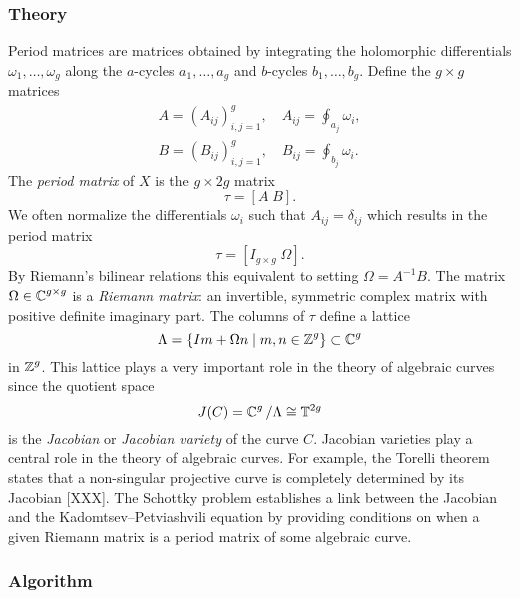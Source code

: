 %
\subsubsection*{Theory}
%

Period matrices are matrices obtained by integrating the holomorphic
differentials $\omega_1, \ldots, \omega_g$ along the $a$-cycles
$a_1,\ldots,a_g$ and $b$-cycles $b_1,\ldots,b_g$. Define the $g \times g$
matrices
\begin{align*}
    A = \left( A_{ij} \right)_{i,j=1}^g,
    \quad A_{ij} = \oint_{a_j} \omega_i, \\
    B = \left( B_{ij} \right)_{i,j=1}^g,
    \quad B_{ij} = \oint_{b_j} \omega_i.
\end{align*}
The {\it period matrix} of $X$ is the $g \times 2g$ matrix
\[
  \tau = \left[ A \; B \right].
\]
We often normalize the differentials $\omega_i$ such that $A_{ij} =
\delta_{ij}$ which results in the period matrix
\begin{equation} \label{eqn: period-matrix}
  \tau = \left[ I_{g \times g} \; \Omega \right].
\end{equation}
By Riemann's bilinear relations this equivalent to setting $\Omega =
A^{-1}B$. The matrix $\Omega \in \operatorname{\mathbb{C}}^{g \times g}$ is a {\it Riemann
  matrix}: an invertible, symmetric complex matrix with positive
definite imaginary part. The columns of $\tau$ define a lattice
\[
    \Lambda = \{I m + \Omega n \; | \; m,n \in \operatorname{\mathbb{Z}}^g\} \subset \operatorname{\mathbb{C}}^g
\]
in $\operatorname{\mathbb{Z}}^g$. This lattice plays a very important role in the theory of
algebraic curves since the quotient space
\begin{equation} \label{eqn: jacobian}
  J(C) = \operatorname{\mathbb{C}}^g / \Lambda \cong \mathbb{T}^{2g}
\end{equation}
is the {\it Jacobian} or {\it Jacobian variety} of the curve
$C$. Jacobian varieties play a central role in the theory of algebraic
curves. For example, the Torelli theorem states that a non-singular
projective curve is completely determined by its Jacobian [XXX]. The
Schottky problem establishes a link between the Jacobian and the
Kadomtsev--Petviashvili equation by providing conditions on when a given
Riemann matrix is a period matrix of some algebraic curve.


%
\subsubsection*{Algorithm}
%

